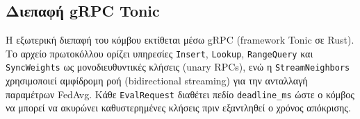 \subsection{Διεπαφή gRPC Tonic}
\label{subsec:impl_grpc_lead}

Η εξωτερική διεπαφή του κόμβου εκτίθεται μέσω gRPC (framework Tonic σε Rust). Το αρχείο πρωτοκόλλου ορίζει υπηρεσίες \texttt{Insert}, \texttt{Lookup}, \texttt{RangeQuery} και \texttt{SyncWeights} ως μονοδιευθυντικές κλήσεις (unary RPCs), ενώ η \texttt{StreamNeighbors} χρησιμοποιεί αμφίδρομη ροή (bidirectional streaming) για την ανταλλαγή παραμέτρων FedAvg. Κάθε \texttt{EvalRequest} διαθέτει πεδίο \texttt{deadline\_ms} ώστε ο κόμβος να μπορεί να ακυρώνει καθυστερημένες κλήσεις πριν εξαντληθεί ο χρόνος απόκρισης.


